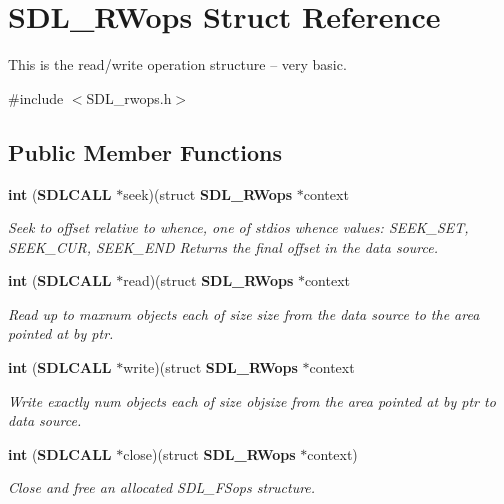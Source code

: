 \section{S\+D\+L\+\_\+\+R\+Wops Struct Reference}
\label{struct_s_d_l___r_wops}


This is the read/write operation structure -- very basic.  




{\ttfamily \#include $<$S\+D\+L\+\_\+rwops.\+h$>$}

\subsection*{Public Member Functions}
\begin{DoxyCompactItemize}
\item 
{\bf int} ({\bf S\+D\+L\+C\+A\+L\+L} $\ast$seek)(struct {\bf S\+D\+L\+\_\+\+R\+Wops} $\ast$context\label{struct_s_d_l___r_wops_a25b6f8f86737e5f6af594d4069885771}

\begin{DoxyCompactList}\small\item\em Seek to \textquotesingle{}offset\textquotesingle{} relative to whence, one of stdio\textquotesingle{}s whence values\+: S\+E\+E\+K\+\_\+\+S\+E\+T, S\+E\+E\+K\+\_\+\+C\+U\+R, S\+E\+E\+K\+\_\+\+E\+N\+D Returns the final offset in the data source. \end{DoxyCompactList}\item 
{\bf int} ({\bf S\+D\+L\+C\+A\+L\+L} $\ast$read)(struct {\bf S\+D\+L\+\_\+\+R\+Wops} $\ast$context
\begin{DoxyCompactList}\small\item\em Read up to \textquotesingle{}maxnum\textquotesingle{} objects each of size \textquotesingle{}size\textquotesingle{} from the data source to the area pointed at by \textquotesingle{}ptr\textquotesingle{}. \end{DoxyCompactList}\item 
{\bf int} ({\bf S\+D\+L\+C\+A\+L\+L} $\ast$write)(struct {\bf S\+D\+L\+\_\+\+R\+Wops} $\ast$context
\begin{DoxyCompactList}\small\item\em Write exactly \textquotesingle{}num\textquotesingle{} objects each of size \textquotesingle{}objsize\textquotesingle{} from the area pointed at by \textquotesingle{}ptr\textquotesingle{} to data source. \end{DoxyCompactList}\item 
{\bf int} ({\bf S\+D\+L\+C\+A\+L\+L} $\ast$close)(struct {\bf S\+D\+L\+\_\+\+R\+Wops} $\ast$context)\label{struct_s_d_l___r_wops_ab303bcbb0f6742a141ba8b2998923f47}

\begin{DoxyCompactList}\small\item\em Close and free an allocated S\+D\+L\+\_\+\+F\+Sops structure. \end{DoxyCompactList}\end{DoxyCompactItemize}
